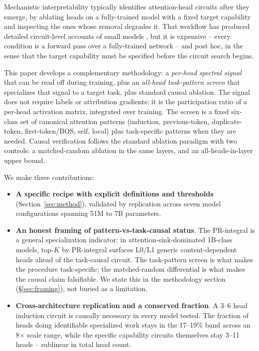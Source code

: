 \documentclass[11pt]{article}
\begin{document}
Mechanistic interpretability typically identifies attention-head circuits after they emerge, by ablating heads on a fully-trained model with a fixed target capability and inspecting the ones whose removal degrades it. That workflow has produced detailed circuit-level accounts of small models \citep{olsson2022induction, wang2022ioi, conmy2023acdc, hanna2023greater, gould2023successor}, but it is expensive -- every condition is a forward pass over a fully-trained network -- and post hoc, in the sense that the target capability must be specified before the circuit search begins.

This paper develops a complementary methodology: a \emph{per-head spectral signal} that can be read off during training, plus an \emph{all-head task-pattern screen} that specializes that signal to a target task, plus standard causal ablation. The signal does not require labels or attribution gradients; it is the participation ratio of a per-head activation matrix, integrated over training. The screen is a fixed six-class set of canonical attention patterns (induction, previous-token, duplicate-token, first-token/BOS, self, local) plus task-specific patterns when they are needed. Causal verification follows the standard ablation paradigm with two controls: a matched-random ablation in the same layers, and an all-heads-in-layer upper bound.

We make three contributions:

\begin{itemize}[leftmargin=*,topsep=2pt,itemsep=2pt]
\item \textbf{A specific recipe with explicit definitions and thresholds} (Section~\ref{sec:method}), validated by replication across seven model configurations spanning 51M to 7B parameters.
\item \textbf{An honest framing of pattern-vs-task-causal status}. The PR-integral is a general specialization indicator: in attention-sink-dominated 1B-class models, top-$K$ by PR-integral surfaces L0/L1 generic content-dependent heads ahead of the task-causal circuit. The task-pattern screen is what makes the procedure task-specific; the matched-random differential is what makes the causal claim falsifiable. We state this in the methodology section (\S\ref{sec:framing}), not buried as a limitation.
\item \textbf{Cross-architecture replication and a conserved fraction}. A 3--6 head induction circuit is causally necessary in every model tested. The fraction of heads doing identifiable specialized work stays in the 17--19\% band across an 8$\times$ scale range, while the specific capability circuits themselves stay 3--11 heads -- sublinear in total head count.
\end{itemize}
\end{document}
